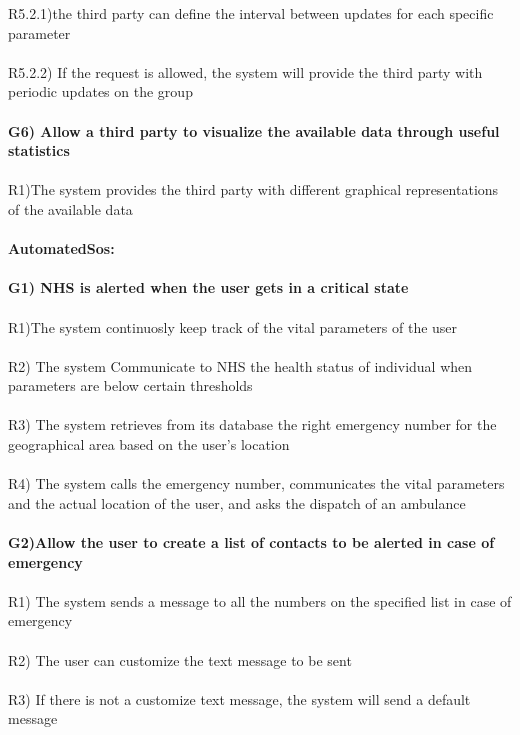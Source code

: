 R5.2.1)the third party can define the interval between updates for each specific parameter \\ \\
R5.2.2) If the request is allowed, the system will provide the third party with periodic updates on the group \\ \\ 
\textbf{G6) Allow a third party to visualize the available data through useful statistics} \\ \\
R1)The system provides the third party with different graphical representations of the available data \\ \\

\textbf{AutomatedSos:} \\ \\ 
\textbf{G1) NHS is alerted when the user gets in a critical state} \\ \\
R1)The system continuosly keep track of the vital parameters of the user \\ \\
R2) The system Communicate to NHS the health status of individual when parameters are below certain thresholds \\ \\
R3) The system retrieves from its database the right emergency number for the geographical area based on the user’s location \\ \\
R4) The system calls the emergency number, communicates the vital parameters and the actual location of the user, and asks the dispatch of an ambulance \\ \\
\textbf{G2)Allow the user to create a list of contacts to be alerted  in case of emergency} \\ \\
R1) The system sends a message to all the numbers on the specified list in case of emergency \\ \\
R2) The user can customize the  text message to be sent \\ \\
R3) If there is not a customize text message, the system will send a default message \\ \\

